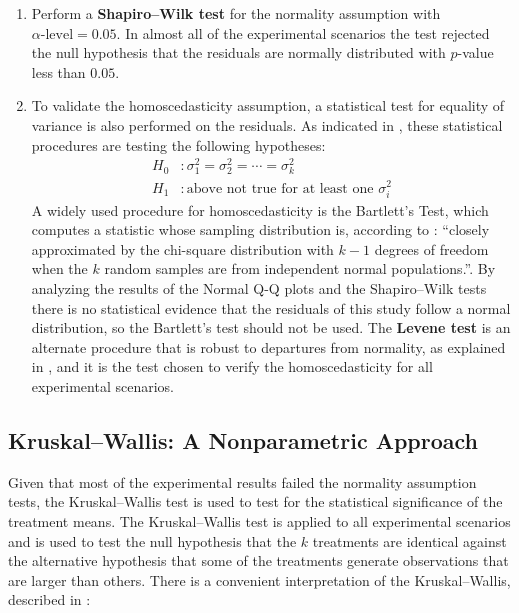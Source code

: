 \begin{enumerate}
    \item Perform a {\large\textbf{Shapiro–Wilk test}} for the normality assumption with $\alpha\text{-level} = 0.05$. In almost all of the experimental scenarios the test rejected the null hypothesis that the residuals are normally distributed with $p$-value less than $0.05$.

    \item To validate the homoscedasticity assumption, a statistical test for equality of variance is also performed on the residuals. As indicated in \cite{montgomery2017design}, these statistical procedures are testing the following hypotheses:
    \begin{align*}
        H_0 &: \sigma^2_1 =  \sigma^2_2 = \cdots =  \sigma^2_k \\
        H_1 &: \text{above not true for at least one } \sigma^2_i    
    \end{align*}
    A widely used procedure for homoscedasticity is the Bartlett's Test, which computes a statistic whose sampling distribution is, according to \cite{montgomery2017design}: ``closely approximated by the chi-square distribution with $k - 1$ degrees of freedom when the $k$ random samples are from independent normal populations.''. By analyzing the results of the Normal Q-Q plots and the Shapiro–Wilk tests there is no statistical evidence that the residuals of this study follow a normal distribution, so the Bartlett's test should not be used.
    The {\large\textbf{Levene test}} is an alternate procedure that is robust to departures from normality, as explained in \cite{brown1974robust}, and it is the test chosen to verify the homoscedasticity for all experimental scenarios.
    
\end{enumerate}

\subsection{Kruskal–Wallis: A Nonparametric Approach}

Given that most of the experimental results failed the normality assumption tests, the Kruskal–Wallis test is used to test for the statistical significance of the treatment means. The Kruskal–Wallis test is applied to all experimental scenarios and is used to test the null hypothesis that the $k$ treatments are identical against the alternative hypothesis that some of the treatments generate observations that are larger than others. There is a convenient interpretation of the Kruskal–Wallis, described in \cite{montgomery2017design}:

